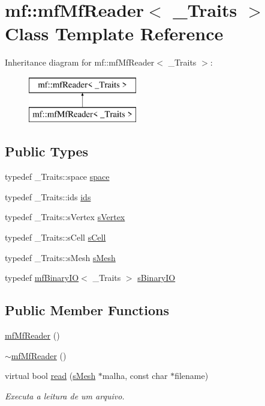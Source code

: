 \hypertarget{classmf_1_1mfMfReader}{
\section{mf::mfMfReader$<$ \_\-Traits $>$ Class Template Reference}
\label{classmf_1_1mfMfReader}
}
Inheritance diagram for mf::mfMfReader$<$ \_\-Traits $>$:\begin{figure}[H]
\begin{center}
\leavevmode
\includegraphics[height=2.000000cm]{classmf_1_1mfMfReader}
\end{center}
\end{figure}
\subsection*{Public Types}
\begin{DoxyCompactItemize}
\item 
typedef \_\-Traits::space \hyperlink{classmf_1_1mfMfReader_afc7cecbd97bfb29aaa9725b37e1e3de6}{space}
\item 
typedef \_\-Traits::ids \hyperlink{classmf_1_1mfMfReader_ace0c24e773b00ea08ddc459d747f4b0b}{ids}
\item 
typedef \_\-Traits::sVertex \hyperlink{classmf_1_1mfMfReader_ae5f152e9da9821af7369d310237c7906}{sVertex}
\item 
typedef \_\-Traits::sCell \hyperlink{classmf_1_1mfMfReader_ad706d4b18bc925ccb011c9973c108dc9}{sCell}
\item 
typedef \_\-Traits::sMesh \hyperlink{classmf_1_1mfMfReader_a12c6ee10508f5805b2cddc729407a1f3}{sMesh}
\item 
typedef \hyperlink{classmf_1_1mfBinaryIO}{mfBinaryIO}$<$ \_\-Traits $>$ \hyperlink{classmf_1_1mfMfReader_a2709026b1c067b6d0e14ed23fdb23a2d}{sBinaryIO}
\end{DoxyCompactItemize}
\subsection*{Public Member Functions}
\begin{DoxyCompactItemize}
\item 
\hyperlink{classmf_1_1mfMfReader_af06cbc1264cf7fbe21bdb43b5dab41e7}{mfMfReader} ()
\item 
\hyperlink{classmf_1_1mfMfReader_a41dce1f0e6bb72b87778bd238966e76a}{$\sim$mfMfReader} ()
\item 
virtual bool \hyperlink{classmf_1_1mfMfReader_a9e43439ba77d2afb25839f3ed4fb774f}{read} (\hyperlink{classmf_1_1mfMfReader_a12c6ee10508f5805b2cddc729407a1f3}{sMesh} $\ast$malha, const char $\ast$filename)
\begin{DoxyCompactList}\small\item\em Executa a leitura de um arquivo. \item\end{DoxyCompactList}\end{DoxyCompactItemize}
